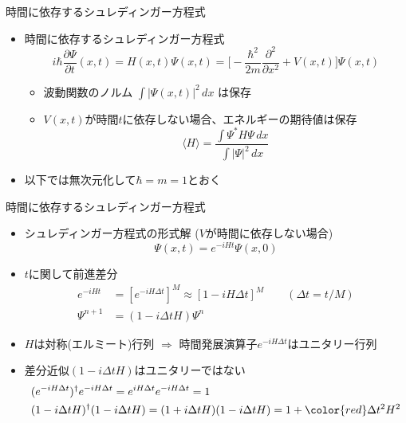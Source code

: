 \begin{frame}[t]{時間に依存するシュレディンガー方程式}
  \begin{itemize}
  \item 時間に依存するシュレディンガー方程式
    \[
    i \hbar \frac{\partial \Psi}{\partial t}(x,t) = H(x,t) \Psi(x,t) = \Big[ - \frac{\hbar^2}{2m} \frac{\partial^2}{\partial x^2} + V(x,t) \Big] \Psi(x,t)
    \]
    \begin{itemize}
    \item 波動関数のノルム $\displaystyle \int | \Psi(x,t) |^2 \, dx$ は保存
    \item $V(x,t)$が時間$t$に依存しない場合、エネルギーの期待値は保存
      \[
      \langle H \rangle = \frac{\displaystyle \int \Psi^* H \Psi \, dx}{\displaystyle \int | \Psi |^2 \, dx}
      \]
    \end{itemize}
  \item 以下では無次元化して$\hbar = m = 1$とおく
  \end{itemize}
\end{frame}

\begin{frame}[t]{時間に依存するシュレディンガー方程式}
  \begin{itemize}
  \item シュレディンガー方程式の形式解 ($V$が時間に依存しない場合)
    \[
    \Psi(x,t) = e^{-i H t} \Psi(x,0)
    \]
  \item $t$に関して前進差分
    \begin{align*}
      e^{-i H t} &= [e^{-i H \Delta t}]^M \approx [1 - i H \Delta t]^M \qquad (\Delta t = t / M) \\
      \Psi^{n+1} &= (1 -  i \Delta t H) \Psi^{n}
    \end{align*}
  \item $H$は対称(エルミート)行列 $\Rightarrow$ 時間発展演算子$e^{-i H \Delta t}$はユニタリー行列
  \item 差分近似$(1 -  i \Delta t H)$はユニタリーではない
    \begin{align*}
      & (e^{-i H \Delta t})^\dagger e^{-i H \Delta t} = e^{i H \Delta t} e^{-i H \Delta t} = 1 \\
      & (1 -  i \Delta t H)^\dagger (1 -  i \Delta t H) = (1 +  i \Delta t H) (1 -  i \Delta t H) = 1 + {\color{red} \Delta t^2 H^2}
    \end{align*}
  \end{itemize}
\end{frame}

